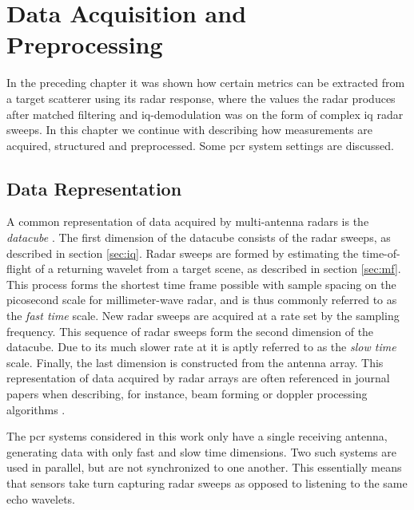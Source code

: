 \chapter{Data Acquisition and Preprocessing}\label{ch:3}

In the preceding chapter it was shown how certain metrics can be extracted from a target scatterer using its radar response, where the values the radar produces after matched filtering and \gls{iq}-demodulation was on the form of complex \gls{iq} radar sweeps. In this chapter we continue with describing how measurements are acquired, structured and preprocessed. Some \gls{pcr} system settings are discussed.

\section{Data Representation}

A common representation of data acquired by multi-antenna radars is the \emph{datacube} \citep{richards_2014}. The first dimension of the datacube consists of the radar sweeps, as described in section \ref{sec:iq}. Radar sweeps are formed by estimating the time-of-flight of a returning wavelet from a target scene, as described in section \ref{sec:mf}. This process forms the shortest time frame possible with sample spacing on the picosecond scale for millimeter-wave radar, and is thus commonly referred to as the \emph{fast time} scale. New radar sweeps are acquired at a rate set by the sampling frequency. This sequence of radar sweeps form the second dimension of the datacube. Due to its much slower rate at it is aptly referred to as the \emph{slow time} scale. Finally, the last dimension is constructed from the antenna array. This representation of data acquired by radar arrays are often referenced in journal papers when describing, for instance, beam forming or doppler processing algorithms \citep{gentile_donovan_2018}. 

The \gls{pcr} systems considered in this work only have a single receiving antenna, generating data with only fast and slow time dimensions. Two such systems are used in parallel, but are not synchronized to one another. This essentially means that sensors take turn capturing radar sweeps as opposed to listening to the same echo wavelets. %

